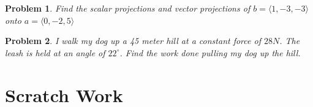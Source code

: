 \documentclass[11pt]{article}
\newtheorem{problem}{Problem}
\begin{document}
\vspace{3cm}

\begin{problem}
    Find the scalar projections and vector projections of $b = \langle 1,-3,-3 \rangle$ onto $a = \langle 0,-2,5 \rangle$
\end{problem}

\vspace{3cm}

\begin{problem}
    I walk my dog up a 45 meter hill at a constant force of $28N$. The leash is held at an angle of $22^\circ$. Find the work done pulling my dog up the hill.
\end{problem}

\newpage

\section{Scratch Work}
\end{document}
